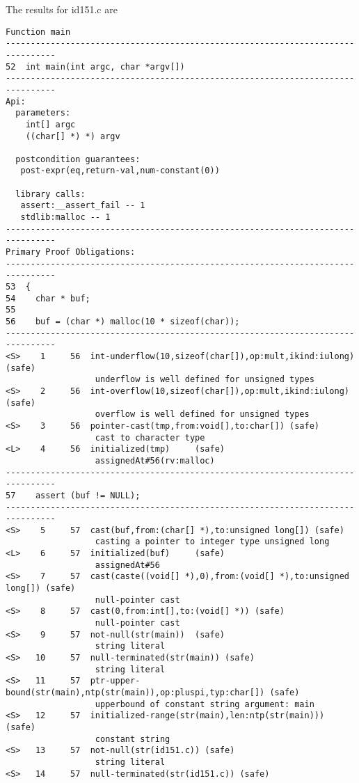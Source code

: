 \documentclass[11pt]{article}
\begin{document}
The results for id151.c are
\begin{small}
\begin{verbatim}
Function main
--------------------------------------------------------------------------------
52  int main(int argc, char *argv[])
--------------------------------------------------------------------------------
Api:
  parameters:
    int[] argc
    ((char[] *) *) argv

  postcondition guarantees:
   post-expr(eq,return-val,num-constant(0))

  library calls:
   assert:__assert_fail -- 1
   stdlib:malloc -- 1
--------------------------------------------------------------------------------
Primary Proof Obligations:
--------------------------------------------------------------------------------
53  {
54    char * buf;
55
56    buf = (char *) malloc(10 * sizeof(char));
--------------------------------------------------------------------------------
<S>    1     56  int-underflow(10,sizeof(char[]),op:mult,ikind:iulong) (safe)
                  underflow is well defined for unsigned types
<S>    2     56  int-overflow(10,sizeof(char[]),op:mult,ikind:iulong) (safe)
                  overflow is well defined for unsigned types
<S>    3     56  pointer-cast(tmp,from:void[],to:char[]) (safe)
                  cast to character type
<L>    4     56  initialized(tmp)     (safe)
                  assignedAt#56(rv:malloc)
--------------------------------------------------------------------------------
57    assert (buf != NULL);
--------------------------------------------------------------------------------
<S>    5     57  cast(buf,from:(char[] *),to:unsigned long[]) (safe)
                  casting a pointer to integer type unsigned long
<L>    6     57  initialized(buf)     (safe)
                  assignedAt#56
<S>    7     57  cast(caste((void[] *),0),from:(void[] *),to:unsigned long[]) (safe)
                  null-pointer cast
<S>    8     57  cast(0,from:int[],to:(void[] *)) (safe)
                  null-pointer cast
<S>    9     57  not-null(str(main))  (safe)
                  string literal
<S>   10     57  null-terminated(str(main)) (safe)
                  string literal
<S>   11     57  ptr-upper-bound(str(main),ntp(str(main)),op:pluspi,typ:char[]) (safe)
                  upperbound of constant string argument: main
<S>   12     57  initialized-range(str(main),len:ntp(str(main))) (safe)
                  constant string
<S>   13     57  not-null(str(id151.c)) (safe)
                  string literal
<S>   14     57  null-terminated(str(id151.c)) (safe)

\end{verbatim}
\end{small}
\end{document}
